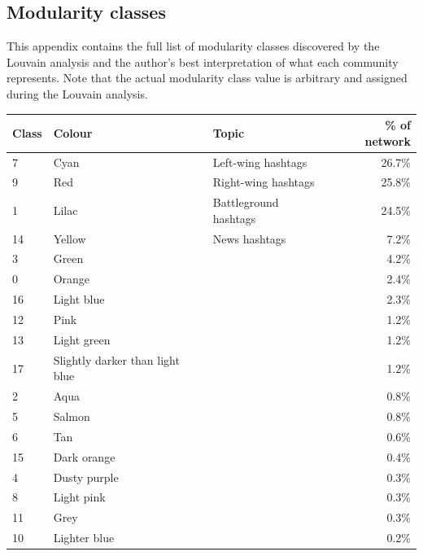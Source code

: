 \documentclass[a4paper,11pt]{article}  %
\begin{document}
\begin{appendices}
	\section{Modularity classes}
	\label{app:modularities}
	This appendix contains the full list of modularity classes discovered by the Louvain analysis and the author's best interpretation of what each community represents. Note that the actual modularity class value is arbitrary and assigned during the Louvain analysis.
	\begin{center}
		\begin{tabular}{||l l l r||} 
			\hline
			Class & Colour & Topic & \% of network \\ [0.5ex] 
			\hline\hline
			7 & Cyan & Left-wing hashtags & 26.7\% \\ 
			\hline
			9 & Red & Right-wing hashtags & 25.8\% \\
			\hline
			1 & Lilac & Battleground hashtags & 24.5\% \\
			\hline
			14 & Yellow & News hashtags & 7.2\% \\
			\hline
			3 & Green &  & 4.2\% \\
			\hline
			0 & Orange &  & 2.4\% \\
			\hline
			16 & Light blue &  & 2.3\% \\
			\hline
			12 & Pink &  & 1.2\% \\
			\hline
			13 & Light green &  & 1.2\% \\
			\hline
			17 & Slightly darker than light blue &  & 1.2\% \\
			\hline
			2 & Aqua &  & 0.8\% \\
			\hline
			5 & Salmon &  & 0.8\% \\
			\hline
			6 & Tan &  & 0.6\% \\
			\hline
			15 & Dark orange &  & 0.4\% \\
			\hline
			4 & Dusty purple &  & 0.3\% \\
			\hline
			8 & Light pink &  & 0.3\% \\
			\hline
			11 & Grey &  & 0.3\% \\
			\hline
			10 & Lighter blue &  & 0.2\% \\
			\hline
		\end{tabular}
	\end{center}
	
	\end{appendices}
	
	\newpage
	\label{sec:references}
	\printbibliography
	
\end{document}
